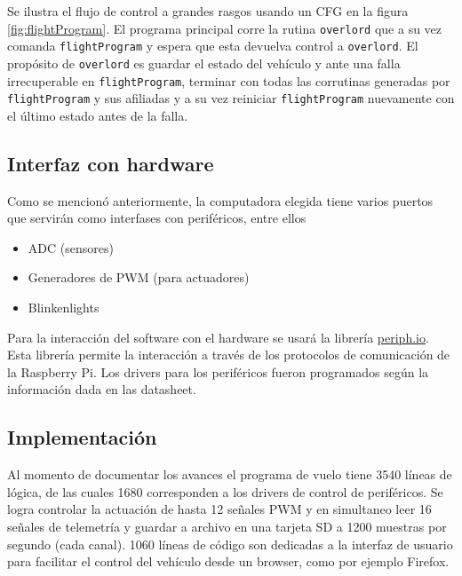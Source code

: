 Se ilustra el flujo de control a grandes rasgos usando un CFG en la figura \ref{fig:flightProgram}. El programa principal corre la rutina \texttt{overlord} que a su vez comanda \texttt{flightProgram} y espera que esta devuelva control a \texttt{overlord}. El propósito de \texttt{overlord} es guardar el estado del vehículo y ante una falla irrecuperable en \texttt{flightProgram}, terminar con todas las corrutinas generadas por \texttt{flightProgram} y sus afiliadas y a su vez reiniciar \texttt{flightProgram} nuevamente con el último estado antes de la falla.


\subsection{Interfaz con hardware}

Como se mencionó anteriormente, la computadora elegida tiene varios puertos que servirán como interfases con periféricos, entre ellos 

\begin{itemize}
    \item ADC (sensores)
    \item Generadores de PWM (para actuadores)
    \item Blinkenlights
\end{itemize}

Para la interacción del software con el hardware se usará la librería \href{https://periph.io}{periph.io}. Esta librería permite la interacción a través de los protocolos de comunicación de la Raspberry Pi. Los drivers para los periféricos fueron programados según la información dada en las datasheet.


\subsection{Implementación}

Al momento de documentar los avances el programa de vuelo tiene 3540 líneas de lógica, de las cuales 1680 corresponden a los drivers de control de periféricos. Se logra controlar la actuación de hasta 12 señales PWM y en simultaneo leer 16 señales de telemetría y guardar a archivo en una tarjeta SD a 1200 muestras por segundo (cada canal). 1060 líneas de código son dedicadas a la interfaz de usuario para facilitar el control del vehículo desde un browser, como por ejemplo Firefox.
